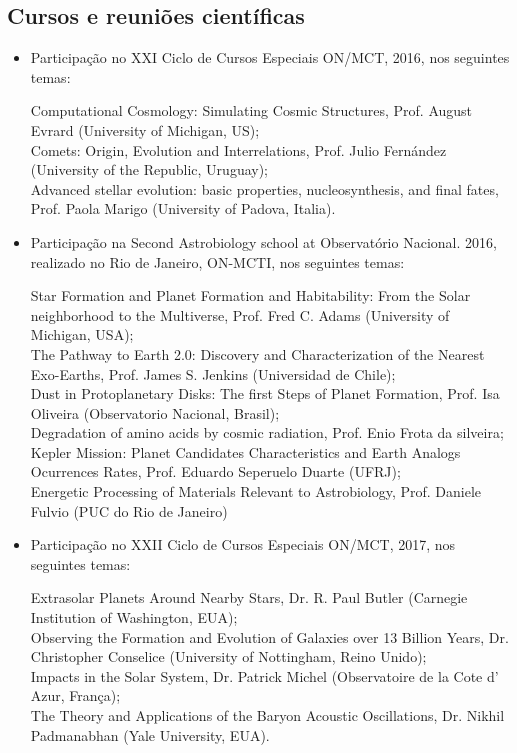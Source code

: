 \documentclass[a4paper, 11pt]{article}
\begin{document}
\subsection{Cursos e reuni\~oes cient\'ificas}

\begin{itemize}
  \item Participação no XXI Ciclo de Cursos Especiais ON/MCT, 2016, nos seguintes temas: 

  Computational Cosmology: Simulating Cosmic Structures, Prof. August Evrard (University of Michigan, US); \\
  Comets: Origin, Evolution and Interrelations, Prof. Julio Fernández (University of the Republic, Uruguay); \\
  Advanced stellar evolution: basic properties, nucleosynthesis, and final fates, Prof. Paola Marigo (University of Padova, Italia).

  \item Participação na Second Astrobiology school at Observatório Nacional. 2016, realizado no Rio de Janeiro, ON-MCTI, nos seguintes temas: 

  Star Formation and Planet Formation and Habitability: From the Solar neighborhood to the Multiverse, Prof. Fred C. Adams (University of Michigan, USA); \\ The Pathway to Earth 2.0: Discovery and Characterization of the Nearest Exo-Earths, Prof. James S. Jenkins (Universidad de Chile); \\
  Dust in Protoplanetary Disks: The first Steps of Planet Formation, Prof. Isa Oliveira (Observatorio Nacional, Brasil); \\
  Degradation of amino acids by cosmic radiation, Prof. Enio Frota da silveira; \\
  Kepler Mission: Planet Candidates Characteristics and Earth Analogs Ocurrences Rates, Prof. Eduardo Seperuelo Duarte (UFRJ); \\
  Energetic Processing of Materials Relevant to Astrobiology, Prof. Daniele Fulvio (PUC do Rio de Janeiro)
  

  \item Participação no XXII Ciclo de Cursos Especiais ON/MCT, 2017, nos seguintes temas: 

  Extrasolar Planets Around Nearby Stars, Dr. R. Paul Butler (Carnegie Institution of Washington, EUA); \\
  Observing the Formation and Evolution of Galaxies over 13 Billion Years, Dr. Christopher Conselice (University of Nottingham, Reino Unido); \\
  Impacts in the Solar System, Dr. Patrick Michel (Observatoire de la Cote d' Azur, França); \\
  The Theory and Applications of the Baryon Acoustic Oscillations, Dr. Nikhil Padmanabhan (Yale University, EUA).
\end{itemize}
\end{document}
